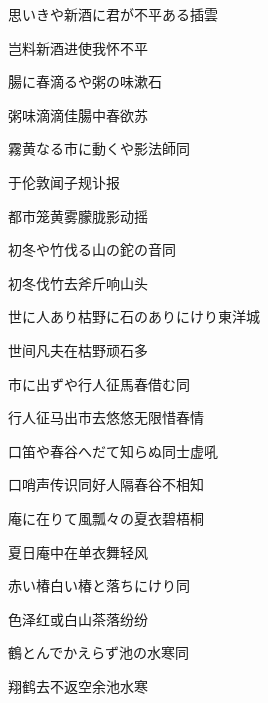 \begin{haiku}
    {\FH 思いきや新酒に君が不平ある}\hfill{\FH 插雲}

    {\FK 岂料新酒进使我怀不平}
\end{haiku}

\begin{haiku}
    {\FH 腸に春滴るや粥の味}\hfill{\FH 漱石}

    {\FK 粥味滴滴佳腸中春欲苏}
\end{haiku}

\begin{haiku}
    {\FH 霧黄なる市に動くや影法師}\hfill{\FH 同}

    {\FK 于伦敦闻子规讣报}

    {\FK 都市笼黄雾朦胧影动摇}
\end{haiku}

\begin{haiku}
    {\FH 初冬や竹伐る山の鉈の音}\hfill{\FH 同}

    {\FK 初冬伐竹去斧斤响山头}
\end{haiku}

\begin{haiku}
    {\FH 世に人あり枯野に石のありにけり}\hfill{\FH 東洋城}

    {\FK 世间凡夫在枯野顽石多}
\end{haiku}

\begin{haiku}
    {\FH 市に出ずや行人征馬春借む}\hfill{\FH 同}

    {\FK 行人征马出市去悠悠无限惜春情}
\end{haiku}

\begin{haiku}
    {\FH 口笛や春谷へだて知らぬ同士}\hfill{\FH 虚吼}

    {\FK 口哨声传识同好人隔春谷不相知}
\end{haiku}

\begin{haiku}
    {\FH 庵に在りて風瓢々の夏衣}\hfill{\FH 碧梧桐}

    {\FK 夏日庵中在单衣舞轻风}
\end{haiku}

\begin{haiku}
    {\FH 赤い椿白い椿と落ちにけり}\hfill{\FH 同}

    {\FK 色泽红或白山茶落纷纷}
\end{haiku}

\begin{haiku}
    {\FH 鶴とんでかえらず池の水寒}\hfill{\FH 同}

    {\FK 翔鹤去不返空余池水寒}
\end{haiku}


